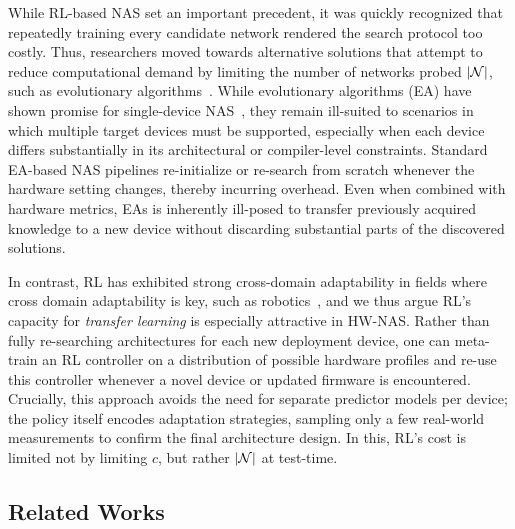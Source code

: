 While RL-based NAS set an important precedent, it was quickly recognized that repeatedly training every candidate network rendered the search protocol too costly. Thus, researchers moved towards alternative solutions that attempt to reduce computational demand by limiting the number of networks probed \( \vert \mathcal N \vert \), such as evolutionary algorithms~\citep{real2017large,cavagnero2023freerea}.
While evolutionary algorithms (EA) have shown promise for single-device NAS~\citep{real2017large,cavagnero2023freerea}, they remain ill-suited to scenarios in which multiple target devices must be supported, especially when each device differs substantially in its architectural or compiler-level constraints. 
Standard EA-based NAS pipelines re-initialize or re-search from scratch whenever the hardware setting changes, thereby incurring overhead. Even when combined with hardware metrics, EAs is inherently ill-posed to transfer previously acquired knowledge to a new device without discarding substantial parts of the discovered solutions.

In contrast, RL has exhibited strong cross-domain adaptability in fields where cross domain adaptability is key, such as robotics~\citep{kober2013reinforcement,akkaya2019solving}, and we thus argue RL's capacity for \emph{transfer learning} is especially attractive in HW-NAS. 
Rather than fully re-searching architectures for each new deployment device, one can meta-train an RL controller on a distribution of possible hardware profiles and re-use this controller whenever a novel device or updated firmware is encountered. 
Crucially, this approach avoids the need for separate predictor models per device; the policy itself encodes adaptation strategies, sampling only a few real-world measurements to confirm the final architecture design.
In this, RL's cost is limited not by limiting \( c \), but rather \( \vert \mathcal N \vert \) at test-time.

\subsection{Related Works}

